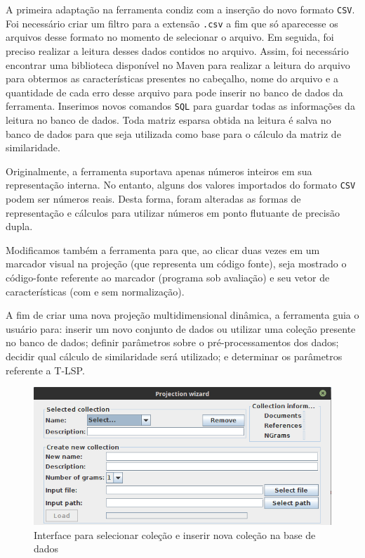 		A primeira adaptação na ferramenta condiz com a inserção do novo formato \texttt{CSV}.
		Foi necessário criar um filtro para a extensão \texttt{.csv} a fim que só aparecesse
		os arquivos desse formato no momento de selecionar o arquivo. Em seguida, foi preciso
		realizar a leitura desses dados contidos no arquivo. Assim, foi necessário encontrar
		uma biblioteca disponível no Maven para realizar a leitura do arquivo para obtermos
		as características presentes no cabeçalho, nome do arquivo e a quantidade de cada
		erro desse arquivo para pode inserir no banco de dados da ferramenta. Inserimos novos
		comandos \texttt{SQL} para guardar todas as informações da leitura no banco de dados.
		Toda matriz esparsa obtida na leitura é salva no banco de dados para que seja
		utilizada como base para o cálculo da matriz de similaridade.
		
		Originalmente, a ferramenta suportava apenas números inteiros em sua representação
		interna. No entanto, alguns dos valores importados do formato \texttt{CSV} podem
		ser números reais. Desta forma, foram alteradas as formas de representação e cálculos
		para utilizar números em ponto flutuante de precisão dupla.
		
		Modificamos também a ferramenta para que, ao clicar duas vezes em um marcador visual
		na projeção (que representa um código fonte), seja mostrado o código-fonte referente
		ao marcador (programa sob avaliação) e
		seu vetor de características (com e sem normalização).
		
		A fim de criar uma nova projeção multidimensional dinâmica, a ferramenta guia o
		usuário para: inserir um novo conjunto de dados ou utilizar uma coleção presente
		no banco de dados; definir parâmetros sobre o pré-processamentos dos dados; decidir
		qual cálculo de similaridade será utilizado; e determinar os parâmetros referente
		a \acs{T-LSP}.
	
		\begin{figure}[b]
			\centering
			\includegraphics[width=0.8\linewidth]{imagem/createDatabase}
			\caption{Interface para selecionar coleção e inserir nova coleção na base de dados}
			\label{fig:createDatabase}
		\end{figure}
		
